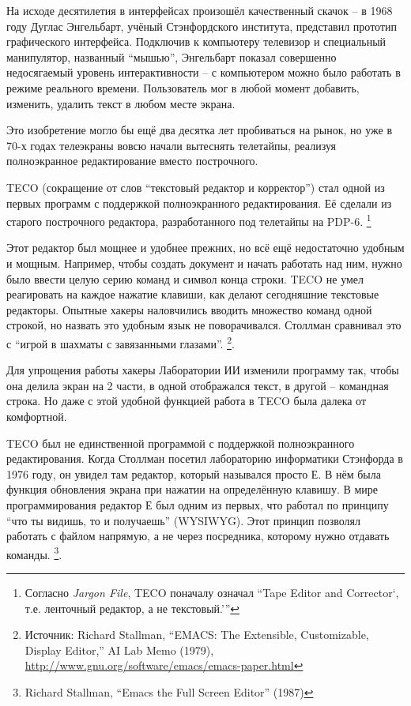 На исходе десятилетия в интерфейсах произошёл качественный скачок -- в 1968 году Дуглас Энгельбарт, учёный Стэнфордского института, представил прототип графического интерфейса. Подключив к компьютеру телевизор и специальный манипулятор, названный \enquote{мышью}, Энгельбарт показал совершенно недосягаемый уровень интерактивности -- с компьютером можно было работать в режиме реального времени. Пользователь мог в любой момент добавить, изменить, удалить текст в любом месте экрана.

Это изобретение могло бы ещё два десятка лет пробиваться на рынок, но уже в 70-х годах телеэкраны вовсю начали вытеснять телетайпы, реализуя полноэкранное редактирование вместо построчного.

TECO (сокращение от слов \enquote{текстовый редактор и корректор}) стал одной из первых программ с поддержкой полноэкранного редактирования. Её сделали из старого построчного редактора, разработанного под телетайпы на PDP-6. \footnote{Согласно \textit{Jargon File}, TECO поначалу означал \enquote{Tape Editor and Corrector\enquote{, т.е. ленточный редактор, а не текстовый.}}}

Этот редактор был мощнее и удобнее прежних, но всё ещё недостаточно удобным и мощным. Например, чтобы создать документ и начать работать над ним, нужно было ввести целую серию команд и символ конца строки. TECO не умел реагировать на каждое нажатие клавиши, как делают сегодняшние текстовые редакторы. Опытные хакеры наловчились вводить множество команд одной строкой, но назвать это удобным язык не поворачивался. Столлман сравнивал это с \enquote{игрой в шахматы с завязанными глазами}. \footnote{Источник: Richard Stallman, \enquote{EMACS: The Extensible, Customizable, Display Editor,} AI Lab Memo (1979), \url{http://www.gnu.org/software/emacs/emacs-paper.html}}.

Для упрощения работы хакеры Лаборатории ИИ изменили программу так, чтобы она делила экран на 2 части, в одной отображался текст, в другой -- командная строка. Но даже с этой удобной функцией работа в TECO была далека от комфортной.

TECO был не единственной программой с поддержкой полноэкранного редактирования. Когда Столлман посетил лабораторию информатики Стэнфорда в 1976 году, он увидел там редактор, который назывался просто Е. В нём была функция обновления экрана при нажатии на определённую клавишу. В мире программирования редактор Е был одним из первых, что работал по принципу \enquote{что ты видишь, то и получаешь} (WYSIWYG). Этот принцип позволял работать с файлом напрямую, а не через посредника, которому нужно отдавать команды. \footnote{Richard Stallman, \enquote{Emacs the Full Screen Editor} (1987)}.


